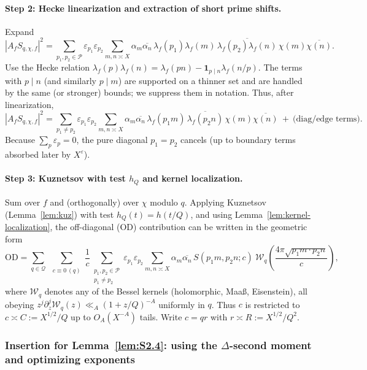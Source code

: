 \documentclass[11pt]{article}
\theoremstyle{definition}
\theoremstyle{remark}
\begin{document}
\paragraph{Step 2: Hecke linearization and extraction of short prime shifts.}
Expand
\[
	|A_f S_{q,\chi,f}|^2
	=\sum_{p_1,p_2\in\mathcal P}\varepsilon_{p_1}\varepsilon_{p_2}
	\sum_{m,n\asymp X}\alpha_m\overline{\alpha_n}\,
	\lambda_f(p_1)\lambda_f(m)\,\overline{\lambda_f(p_2)\lambda_f(n)}\,\chi(m)\overline{\chi(n)}.
\]
Use the Hecke relation $\lambda_f(p)\lambda_f(n)=\lambda_f(pn)-\mathbf 1_{p\mid n}\lambda_f(n/p)$.
The terms with $p\mid n$ (and similarly $p\mid m$) are supported on a thinner set and are handled by the same (or stronger) bounds; we suppress them in notation.
Thus, after linearization,
\[
	|A_f S_{q,\chi,f}|^2
	= \sum_{p_1\ne p_2}\varepsilon_{p_1}\varepsilon_{p_2}
	\!\!\sum_{m,n\asymp X}\!\alpha_m\overline{\alpha_n}\,
	\lambda_f(p_1 m)\,\overline{\lambda_f(p_2 n)}\,\chi(m)\overline{\chi(n)}
	\ +\ \text{(diag/edge terms)}.
\]
Because $\sum_{p}\varepsilon_p=0$, the pure diagonal $p_1=p_2$ cancels (up to boundary terms absorbed later by $X^\varepsilon$).

\paragraph{Step 3: Kuznetsov with test $h_Q$ and kernel localization.}
Sum over $f$ and (orthogonally) over $\chi$ modulo $q$.
Applying Kuznetsov (Lemma~\ref{lem:kuz}) with test $h_Q(t)=h(t/Q)$, and using Lemma~\ref{lem:kernel-localization},
the off-diagonal (OD) contribution can be written in the geometric form
\[
	\mathrm{OD}
	=\sum_{q\in\mathcal Q}\ \sum_{\substack{c\equiv 0\ (q)}} \frac{1}{c}
	\sum_{\substack{p_1,p_2\in\mathcal P\\ p_1\ne p_2}}\varepsilon_{p_1}\varepsilon_{p_2}
	\sum_{m,n\asymp X}\alpha_m\overline{\alpha_n}\,
	S(p_1 m, p_2 n;c)\ \mathcal W_q\!\left(\frac{4\pi\sqrt{p_1 m\cdot p_2 n}}{c}\right),
\]
where $\mathcal W_q$ denotes any of the Bessel kernels (holomorphic, Maaß, Eisenstein),
all obeying $z^j\partial_z^j\mathcal W_q(z)\ll_A(1+z/Q)^{-A}$ uniformly in $q$.
Thus $c$ is restricted to $c\asymp C:=X^{1/2}/Q$ up to $O_A(X^{-A})$ tails.
Write $c=qr$ with $r\asymp R:=X^{1/2}/Q^2$.
\subsubsection*{Insertion for Lemma~\ref{lem:S2.4}: using the $\Delta$-second moment and optimizing exponents}
\end{document}
